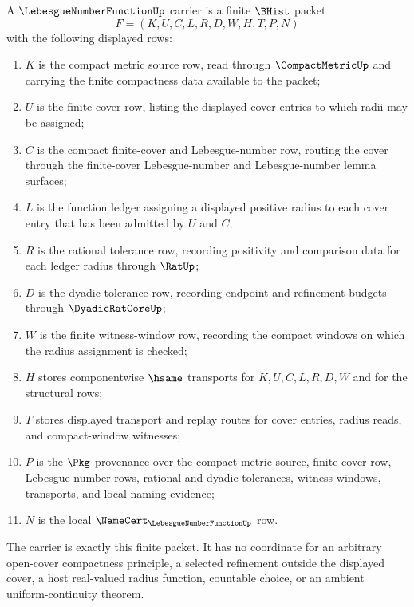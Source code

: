 \begin{definition}
\label{def:lebesgue-number-function-carrier}
A $\LebesgueNumberFunctionUp$ carrier is a finite $\BHist$ packet
$$
F=(K,U,C,L,R,D,W,H,T,P,N)
$$
with the following displayed rows:
\begin{enumerate}
\item $K$ is the compact metric source row, read through $\CompactMetricUp$ and carrying the finite compactness data available to the packet;
\item $U$ is the finite cover row, listing the displayed cover entries to which radii may be assigned;
\item $C$ is the compact finite-cover and Lebesgue-number row, routing the cover through the finite-cover Lebesgue-number and Lebesgue-number lemma surfaces;
\item $L$ is the function ledger assigning a displayed positive radius to each cover entry that has been admitted by $U$ and $C$;
\item $R$ is the rational tolerance row, recording positivity and comparison data for each ledger radius through $\RatUp$;
\item $D$ is the dyadic tolerance row, recording endpoint and refinement budgets through $\DyadicRatCoreUp$;
\item $W$ is the finite witness-window row, recording the compact windows on which the radius assignment is checked;
\item $H$ stores componentwise $\hsame$ transports for $K,U,C,L,R,D,W$ and for the structural rows;
\item $T$ stores displayed transport and replay routes for cover entries, radius reads, and compact-window witnesses;
\item $P$ is the $\Pkg$ provenance over the compact metric source, finite cover row, Lebesgue-number rows, rational and dyadic tolerances, witness windows, transports, and local naming evidence;
\item $N$ is the local $\NameCert_{\LebesgueNumberFunctionUp}$ row.
\end{enumerate}
The carrier is exactly this finite packet. It has no coordinate for an arbitrary open-cover compactness principle, a selected refinement outside the displayed cover, a host real-valued radius function, countable choice, or an ambient uniform-continuity theorem.
\end{definition}

